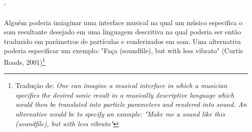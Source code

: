 \documentclass[
	12pt,				%
	openright,			%
	twoside,			%
	a4paper,			%
	english,			%
	french,				%
	spanish,			%
        italian,                        %
	brazil				%
	]{abntex2}
\begin{document}
\frenchspacing 

\pretextual

\imprimircapa

\imprimirfolhaderosto*

%


% 
%

'%

\begin{epigrafe}
Alguém poderia imiaginar uma interface musical na qual um músico especifica o som resultante desejado em uma linguagem descritiva na qual poderia ser então traduzido em parâmetros de partículas e renderizados em som. Uma alternativa poderia especificar um exemplo: "Faça (soundfile), but with less vibrato" (Curtis Roads, 2001)\footnote{Tradução de: \emph{One can imagine a musical interface in which a musician specifies the desired sonic result in a musically descriptive language which would then be translated into particle parameters and rendered into sound. An alternative would be to specify an example: "Make me a sound like this (soundfile), but with less vibrato"}}
\end{epigrafe}

%
%
\tableofcontents*
\cleardoublepage
\textual
\end{document}

